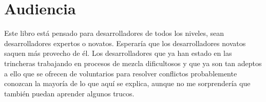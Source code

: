 
\section{Audiencia}

Este libro está pensado para desarrolladores de todos los niveles, sean desarrolladores expertos o novatos. Esperaría que los desarrolladores
novatos saquen más provecho de él. Los desarrolladores que ya han estado en las trincheras trabajando en procesos de mezcla dificultosos
y que ya son tan adeptos a ello que se ofrecen de voluntarios para resolver conflictos probablemente conozcan la mayoría de lo que aquí
se explica, aunque no me sorprendería que también puedan aprender algunos trucos.
